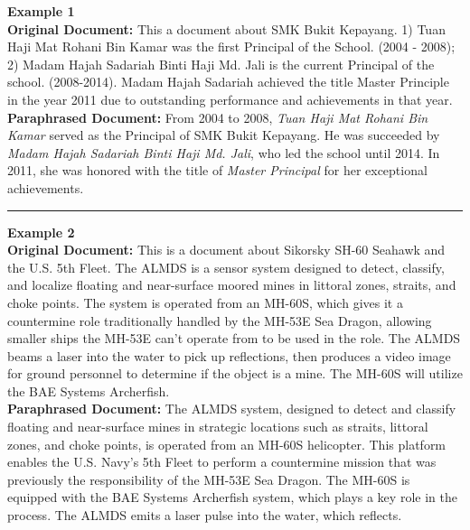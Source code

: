 \documentclass{applemlr}
\numberwithin{equation}{section}
\begin{document}
\begin{table}[!ht]
  \centering
\begin{tcolorbox}[
    colback=gray!3,      
    colframe=gray!40,   
    arc=2mm,             
    boxrule=0.4pt,       
    left=3mm, right=3mm, top=2mm, bottom=2mm,
    width=\linewidth,
    title=\textbf{Examples of Original and Paraphrased Documents Generated from Compressed Representations},
    coltitle=black,
    fonttitle=\bfseries,
]
\small

\textbf{Example 1} \\[2pt]
\textbf{Original Document:}  
This a document about SMK Bukit Kepayang. 1) Tuan Haji Mat Rohani Bin Kamar was the first Principal of the School. (2004 - 2008); 2) Madam Hajah Sadariah Binti Haji Md. Jali is the current Principal of the school. (2008-2014). Madam Hajah Sadariah achieved the title Master Principle in the year 2011 due to outstanding performance and achievements in that year.\\[3pt]

\textbf{Paraphrased Document:}  
From 2004 to 2008, \textit{Tuan Haji Mat Rohani Bin Kamar} served as the Principal of SMK Bukit Kepayang. 
He was succeeded by \textit{Madam Hajah Sadariah Binti Haji Md. Jali}, who led the school until 2014. 
In 2011, she was honored with the title of \textit{Master Principal} for her exceptional achievements. \\[3pt]


\rule{\linewidth}{0.3pt}

\textbf{Example 2} \\[2pt]
\textbf{Original Document:}  
This is a document about Sikorsky SH-60 Seahawk and the U.S. 5th Fleet. 
The ALMDS is a sensor system designed to detect, classify, and localize floating and near-surface moored mines  
in littoral zones, straits, and choke points. The system is operated from an MH-60S, which gives it a countermine role traditionally handled by the MH-53E Sea Dragon, allowing smaller ships the MH-53E can't operate from to be used in the role. The ALMDS beams a laser into the water to pick up reflections, then produces a video image for ground personnel to determine if the object is a mine. The MH-60S will utilize the BAE Systems Archerfish.\\[3pt]

\textbf{Paraphrased Document:}  
The ALMDS system, designed to detect and classify floating and near-surface mines in strategic locations such as straits, littoral zones, and choke points, is operated from an MH-60S helicopter. This platform enables the U.S. Navy’s 5th Fleet to perform a countermine mission that was previously the responsibility of the MH-53E Sea Dragon. The MH-60S is equipped with the BAE Systems Archerfish system, which plays a key role in the process. The ALMDS emits a laser pulse into the water, which reflects.  \\[3pt]



\end{tcolorbox}
\end{table}
\end{document}

